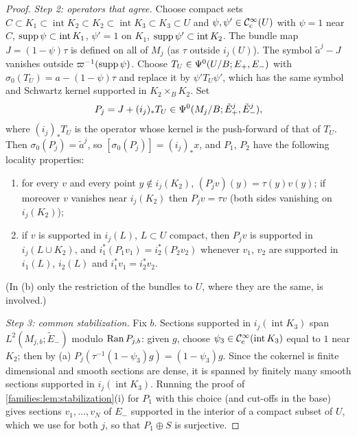\begin{proof}
  \emph{Step 2: operators that agree.} Choose compact sets $C\subset
  K_1\subset\operatorname{int}K_2\subset K_2\subset\operatorname{int}K_3
  \subset K_3\subset U$ and $\psi,\psi'\in\mathcal{C}^\infty_{\mathrm{c}}(U)$ with $\psi=1$ near $C$,
  $\operatorname{supp}\psi\subset\operatorname{int}K_1$, $\psi'=1$ on $K_1$,
  $\operatorname{supp}\psi'\subset\operatorname{int}K_2$. The bundle map $J=(1-\psi)\tau$ is
  defined on all of $M_j$ (as $\tau$ outside $i_j(U)$). The symbol $\tilde
  a^j-J$ vanishes outside $\varpi^{-1}(\operatorname{supp}\psi)$. Choose
  $T_U\in\Psi^{0}(U/B;E_+,E_-)$ with $\sigma_0(T_U)=a-(1-\psi)\tau$ and
  replace it by $\psi'T_U\psi'$, which has the same symbol and Schwartz kernel
  supported in $K_2\times_BK_2$. Set
  \begin{equation*}
    P_j=J+(i_j)_*T_U\in\Psi^{0}(M_j/B;\tilde E^j_+,\tilde E^j_-),
  \end{equation*}
  where $(i_j)_*T_U$ is the operator whose kernel is the push-forward of that
  of $T_U$. Then $\sigma_0(P_j)=\tilde a^j$, so $[\sigma_0(P_j)]=(i_j)_*x$, and
  $P_1$, $P_2$ have the following locality properties:
  \begin{enumerate}[label=(\alph*)]
  \item for every $v$ and every point $y\notin i_j(K_2)$,
    $(P_jv)(y)=\tau(y)v(y)$; if moreover $v$ vanishes near $i_j(K_2)$ then
    $P_jv=\tau v$ (both sides vanishing on $i_j(K_2)$);
  \item if $v$ is supported in $i_j(L)$, $L\subset U$ compact, then $P_jv$ is
    supported in $i_j(L\cup K_2)$, and $i_1^*(P_1v_1)=i_2^*(P_2v_2)$ whenever
    $v_1$, $v_2$ are supported in $i_1(L)$, $i_2(L)$ and $i_1^*v_1=i_2^*v_2$.
  \end{enumerate}
  (In (b) only the restriction of the bundles to $U$, where they are the same,
  is involved.)

  \emph{Step 3: common stabilization.} Fix $b$. Sections supported in
  $i_j(\operatorname{int}K_3)$ span $L^2(M_{j,b};\tilde E_-)$ modulo
  $\operatorname{Ran} P_{j,b}$: given $g$, choose $\psi_3\in\mathcal{C}^\infty_{\mathrm{c}}(\operatorname{int}K_3)$
  equal to $1$ near $K_2$; then by (a) $P_j(\tau^{-1}(1-\psi_3)g)=(1-\psi_3)g$.
  Since the cokernel is finite dimensional and smooth sections are dense, it
  is spanned by finitely many smooth sections supported in
  $i_j(\operatorname{int}K_3)$. Running the proof of
  \cref{families:lem:stabilization}(i) for $P_1$ with this choice (and
  cut-offs in the base) gives sections $v_1,\dots,v_N$ of $E_-$ supported in
  the interior of a compact subset of $U$, which we use for both $j$, so that
  $P_1\oplus S$ is surjective.


\end{proof}
